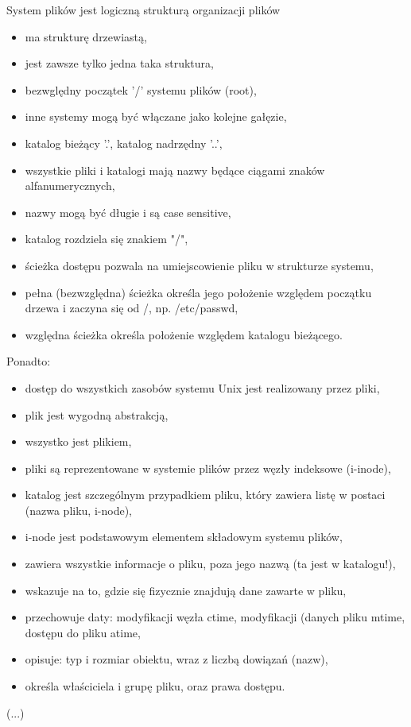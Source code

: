 {

System plików jest logiczną strukturą organizacji plików
\begin{itemize}
\item ma strukturę drzewiastą,
\item jest zawsze tylko jedna taka struktura,
\item bezwględny początek '/' systemu plików (root),
\item inne systemy mogą być włączane jako kolejne gałęzie,
\item katalog bieżący '.', katalog nadrzędny '..',
\item wszystkie pliki i katalogi mają nazwy będące ciągami znaków alfanumerycznych,
\item nazwy mogą być długie i są case sensitive,
\item katalog rozdziela się znakiem "/",
\item ścieżka dostępu pozwala na umiejscowienie pliku w strukturze systemu,
\item pełna (bezwzględna) ścieżka określa jego położenie względem początku drzewa i zaczyna się od /, np. /etc/passwd,
\item względna ścieżka określa położenie względem katalogu bieżącego.
\end{itemize}
Ponadto:
\begin{itemize}
\item dostęp do wszystkich zasobów systemu Unix jest realizowany przez pliki,
\item plik jest wygodną abstrakcją,
\item wszystko jest plikiem,
\item pliki są reprezentowane w systemie plików przez węzły indeksowe (i-inode),
\item katalog jest szczególnym przypadkiem pliku, który zawiera listę w postaci (nazwa pliku, i-node),
\item i-node jest podstawowym elementem składowym systemu plików,
\item zawiera wszystkie informacje o pliku, poza jego nazwą (ta jest w katalogu!),
\item wskazuje na to, gdzie się fizycznie znajdują dane zawarte w pliku,
\item przechowuje daty: modyfikacji węzła ctime, modyfikacji (danych pliku mtime, dostępu do pliku atime,
\item opisuje: typ i rozmiar obiektu, wraz z liczbą dowiązań (nazw),
\item określa właściciela i grupę pliku, oraz prawa dostępu.
\end{itemize}}
{
(...)
}

